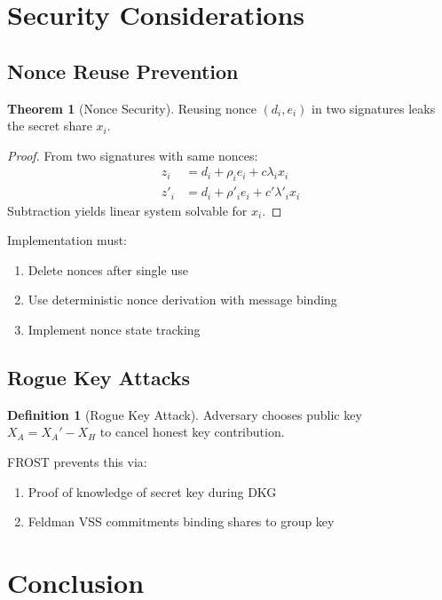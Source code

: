 \documentclass[11pt,a4paper]{article}
\theoremstyle{definition}
\newtheorem{definition}{Definition}
\newtheorem{theorem}{Theorem}
\begin{document}
\section{Security Considerations}

\subsection{Nonce Reuse Prevention}

\begin{theorem}[Nonce Security]
Reusing nonce $(d_i, e_i)$ in two signatures leaks the secret share $x_i$.
\end{theorem}

\begin{proof}
From two signatures with same nonces:
\begin{align*}
z_i &= d_i + \rho_i e_i + c \lambda_i x_i \\
z'_i &= d_i + \rho'_i e_i + c' \lambda'_i x_i
\end{align*}
Subtraction yields linear system solvable for $x_i$.
\end{proof}

Implementation must:
\begin{enumerate}
\item Delete nonces after single use
\item Use deterministic nonce derivation with message binding
\item Implement nonce state tracking
\end{enumerate}

\subsection{Rogue Key Attacks}

\begin{definition}[Rogue Key Attack]
Adversary chooses public key $X_A = X_A' - X_H$ to cancel honest key contribution.
\end{definition}

FROST prevents this via:
\begin{enumerate}
\item Proof of knowledge of secret key during DKG
\item Feldman VSS commitments binding shares to group key
\end{enumerate}

\section{Conclusion}
\end{document}
